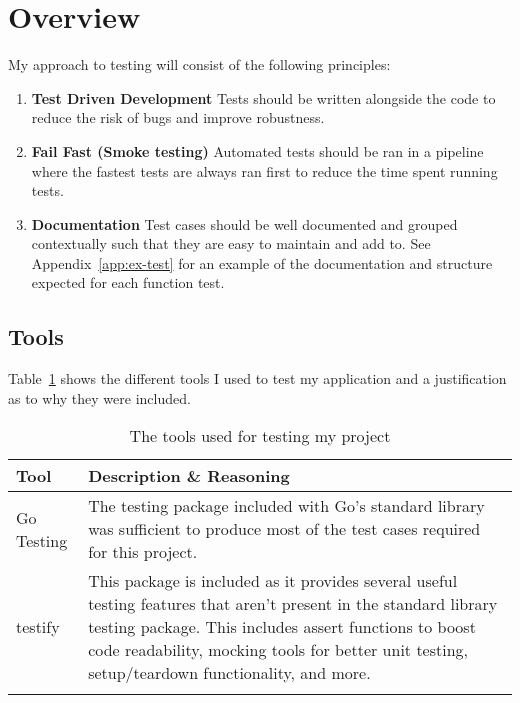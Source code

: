 \section{Overview}

My approach to testing will consist of the following principles:

\begin{enumerate}
  \item \textbf{Test Driven Development} Tests should be written alongside the code to reduce the risk of bugs and improve robustness.
  \item \textbf{Fail Fast (Smoke testing)} Automated tests should be ran in a pipeline where the fastest tests are always ran first to reduce the time spent running tests.
  \item \textbf{Documentation} Test cases should be well documented and grouped contextually such that they are easy to maintain and add to. See Appendix~\ref{app:ex-test} for an example of the documentation and structure expected for each function test.  
\end{enumerate}

\subsection*{Tools}

Table~\ref{tab:tools-testing} shows the different tools I used to test my application and a justification as to why they were included.

\begin{longtable}{p{} p{}}
  \toprule
  \textbf{Tool} & \textbf{Description \& Reasoning}
  \\\midrule\midrule
  Go Testing
  & The testing package included with Go's standard library was sufficient to produce most of the test cases required for this project.
  \\
  testify~\cite{noauthor_testify_2023}
  & This package is included as it provides several useful testing features that aren't present in the standard library testing package. This includes assert functions to boost code readability, mocking tools for better unit testing, setup/teardown functionality, and more.
  \\\bottomrule\bottomrule
  \caption{The tools used for testing my project}
  \label{tab:tools-testing}
\end{longtable}
